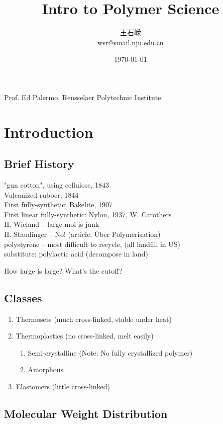 \documentclass[a4paper]{article}
\title{Intro to Polymer Science}
\author{王石嵘\\
wsr@smail.nju.edu.cn
}
\date{\today} %
\begin{document}

\maketitle

\tableofcontents

\newpage

Prof. Ed Palermo, Rensselaer Polytechnic Institute\\
\section{Introduction}
\subsection{Brief History}
"gun cotton", using cellulose, 1843\\
Vulcanized rubber, 1844\\
First fully-synthetic: Bakelite, 1907\\
First linear fully-synthetic: Nylon, 1937, W. Carothers\\

H. Wieland -- large mol is junk\\
H. Staudinger -- No! (article: \"Uber Polymerisation)\\

polystyrene -- most difficult to recycle, (all landfill in US)\\
substitute: polylactic acid (decompose in land)

How large is large? What's the cutoff?

\subsection{Classes}
\begin{enumerate}
	\item Thermosets (much cross-linked, stable under heat)
	\item Thermoplastics (no cross-linked, melt easily)
	\begin{enumerate}
		\item Semi-crystalline (Note: No fully crystallized polymer)
		\item Amorphous
	\end{enumerate}
	\item Elastomers (little cross-linked)
\end{enumerate}

\subsection{Molecular Weight Distribution}
\end{document}
